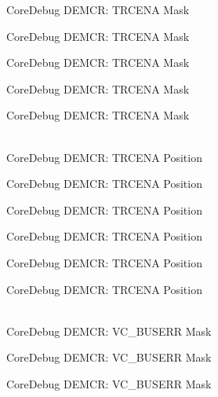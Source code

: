 \begin{DoxyRefList}
\label{deprecated__deprecated000190}%
%
Core\+Debug DEMCR:\+ TRCENA Mask 

\label{deprecated__deprecated000332}%
%
Core\+Debug DEMCR:\+ TRCENA Mask 

\label{deprecated__deprecated000408}%
%
Core\+Debug DEMCR:\+ TRCENA Mask 

\label{deprecated__deprecated000497}%
%
Core\+Debug DEMCR:\+ TRCENA Mask 

\label{deprecated__deprecated000599}%
%
Core\+Debug DEMCR:\+ TRCENA Mask  
\item[{\parbox[t]{\linewidth}{Global \doxylink{group__CMSIS__CoreDebug_ga6ff2102b98f86540224819a1b767ba39}{Core\+Debug\+\_\+\+DEMCR\+\_\+\+TRCENA\+\_\+\+Pos} }}]\hfill \\
\label{deprecated__deprecated000045}%
%
Core\+Debug DEMCR:\+ TRCENA Position 

\label{deprecated__deprecated000189}%
%
Core\+Debug DEMCR:\+ TRCENA Position 

\label{deprecated__deprecated000331}%
%
Core\+Debug DEMCR:\+ TRCENA Position 

\label{deprecated__deprecated000407}%
%
Core\+Debug DEMCR:\+ TRCENA Position 

\label{deprecated__deprecated000496}%
%
Core\+Debug DEMCR:\+ TRCENA Position 

\label{deprecated__deprecated000598}%
%
Core\+Debug DEMCR:\+ TRCENA Position  
\item[{\parbox[t]{\linewidth}{Global \doxylink{group__CMSIS__CoreDebug_ga9d29546aefe3ca8662a7fe48dd4a5b2b}{Core\+Debug\+\_\+\+DEMCR\+\_\+\+VC\+\_\+\+BUSERR\+\_\+\+Msk} }}]\hfill \\
\label{deprecated__deprecated000060}%
%
Core\+Debug DEMCR:\+ VC\+\_\+\+BUSERR Mask 

\label{deprecated__deprecated000204}%
%
Core\+Debug DEMCR:\+ VC\+\_\+\+BUSERR Mask 

\label{deprecated__deprecated000346}%
%
Core\+Debug DEMCR:\+ VC\+\_\+\+BUSERR Mask 


\end{DoxyRefList}
